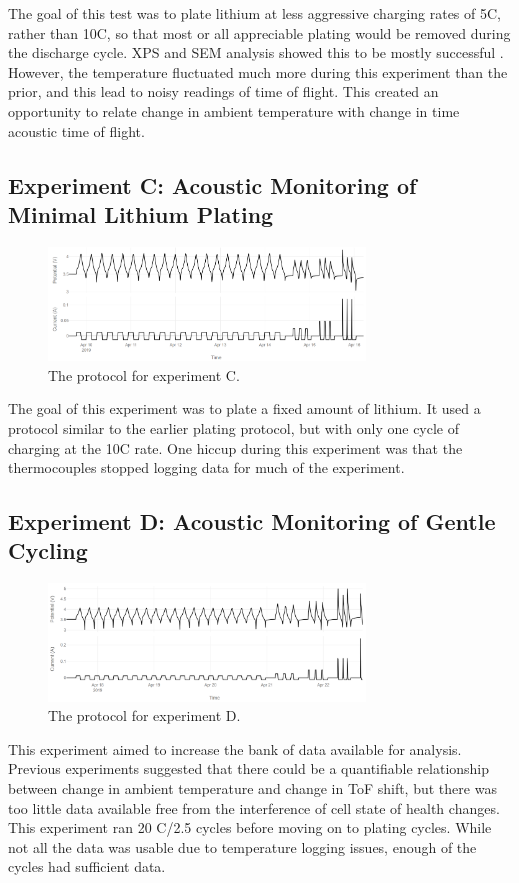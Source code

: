 The goal of this test was to plate lithium at less aggressive charging rates of 5C, rather than 10C, so that most or all appreciable plating would be removed during the discharge cycle. XPS and SEM analysis showed this to be mostly successful . However, the temperature fluctuated much more during this experiment than the prior, and this lead to noisy readings of time of flight. This created an opportunity to relate change in ambient temperature with change in time acoustic time of flight. 

\subsection{Experiment C: Acoustic Monitoring of Minimal Lithium Plating}
\begin{figure}[t]\label{fig:neware0409}
    \includegraphics[width=0.75\textwidth]{Thesis/neware0409.PNG}
    \centering
    \caption{The protocol for experiment C.}
\end{figure}
The goal of this experiment was to plate a fixed amount of lithium. It used a protocol similar to the earlier plating protocol, but with only one cycle of charging at the 10C rate. One hiccup during this experiment was that the thermocouples stopped logging data for much of the experiment. 


\subsection{Experiment D: Acoustic Monitoring of Gentle Cycling}
\begin{figure}[t]\label{fig:neware0417}
    \includegraphics[width=0.75\textwidth]{Thesis/neware0417.PNG}
    \centering
    \caption{The protocol for experiment D.}
\end{figure}
This experiment aimed to increase the bank of data available for analysis. Previous experiments suggested that there could be a quantifiable relationship between change in ambient temperature and change in ToF shift, but there was too little data available free from the interference of cell state of health changes. This experiment ran 20 C/2.5 cycles before moving on to plating cycles. While not all the data was usable due to temperature logging issues, enough of the cycles had sufficient data.
